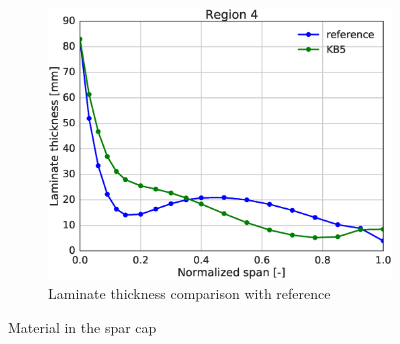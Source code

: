\begin{figure}[tph]
\begin{subfigure}{\textwidth}
\centering
\includegraphics[width=0.50\linewidth]{figures/KB6_final/KB5_r04_thickness.eps}
\caption{Laminate thickness comparison with reference}
\label{subfig:KB5_thick_r04}
\end{subfigure}
\caption{ Material in the spar cap}
\label{fig:KB5_mat_r04}
\end{figure}

